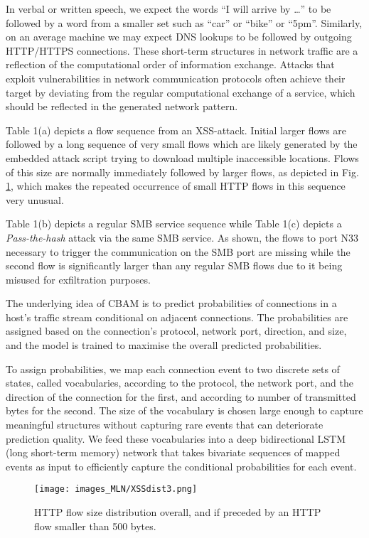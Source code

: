 In verbal or written speech, we expect the words ``I will arrive by \dots'' to be followed by a word from a smaller set such as ``car'' or ``bike'' or ``5pm''. 
Similarly, on an average machine we may expect DNS lookups 
to be followed by outgoing HTTP/HTTPS connections. %
These short-term structures in network traffic are a reflection of the computational order of information exchange. Attacks that exploit vulnerabilities in network communication protocols often achieve their target by deviating from the regular computational exchange of a service, which should be reflected in the generated network pattern. 


Table 1(a) %
depicts a flow sequence from an XSS-attack. Initial larger flows are followed by a long sequence of very small flows which are likely generated by the embedded attack script  trying to download multiple inaccessible locations. Flows of this size are normally immediately followed by larger flows, as depicted in Fig. \ref{Fig:XSSdist}, which makes the repeated occurrence of small HTTP flows in this sequence very unusual. 



Table 1(b) %
depicts a regular SMB service sequence while Table 1(c) %
depicts a \textit{Pass-the-hash} attack via the same SMB service. As shown, the flows to port N33 necessary to trigger the communication on the SMB port are missing while the second flow is significantly larger than any regular SMB flows due to it being misused for exfiltration purposes.




The underlying idea of CBAM is to predict probabilities of connections in a host's traffic stream conditional on adjacent connections. The probabilities are assigned based on the connection's protocol, network port, direction, and size,  and the model is trained to maximise the overall predicted probabilities. 


To assign probabilities, we map each connection event to two discrete sets of states, called vocabularies, according to the protocol, the network port, and the direction of the connection for the first, and according to number of transmitted bytes for the second. The size of the vocabulary is chosen large enough to capture meaningful structures without capturing  rare events that can deteriorate prediction quality. We feed these vocabularies into a deep bidirectional LSTM (long short-term memory) network that takes bivariate sequences of mapped events as input to efficiently capture the conditional probabilities for each event. 
\begin{figure}
\centering
\texttt{[image: images\_MLN/XSSdist3.png]}
\caption{HTTP flow size distribution overall, and if preceded by an HTTP flow smaller than 500 bytes.}\label{Fig:XSSdist}
\end{figure}

